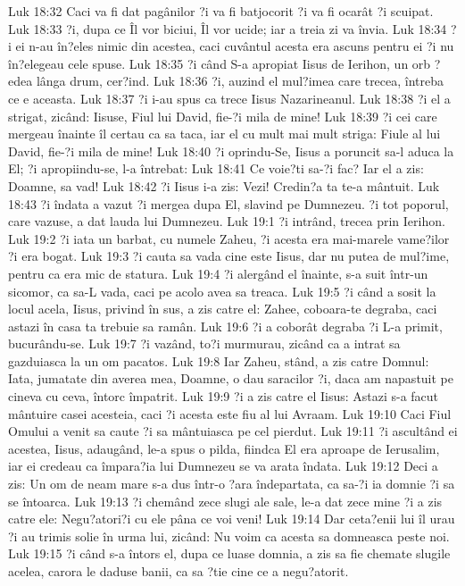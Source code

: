 Luk 18:32  Caci va fi dat pagânilor ?i va fi batjocorit ?i va fi ocarât ?i scuipat.
Luk 18:33  ?i, dupa ce Îl vor biciui, Îl vor ucide; iar a treia zi va învia.
Luk 18:34  ?i ei n-au în?eles nimic din acestea, caci cuvântul acesta era ascuns pentru ei ?i nu în?elegeau cele spuse.
Luk 18:35  ?i când S-a apropiat Iisus de Ierihon, un orb ?edea lânga drum, cer?ind.
Luk 18:36  ?i, auzind el mul?imea care trecea, întreba ce e aceasta.
Luk 18:37  ?i i-au spus ca trece Iisus Nazarineanul.
Luk 18:38  ?i el a strigat, zicând: Iisuse, Fiul lui David, fie-?i mila de mine!
Luk 18:39  ?i cei care mergeau înainte îl certau ca sa taca, iar el cu mult mai mult striga: Fiule al lui David, fie-?i mila de mine!
Luk 18:40  ?i oprindu-Se, Iisus a poruncit sa-l aduca la El; ?i apropiindu-se, l-a întrebat:
Luk 18:41  Ce voie?ti sa-?i fac? Iar el a zis: Doamne, sa vad!
Luk 18:42  ?i Iisus i-a zis: Vezi! Credin?a ta te-a mântuit.
Luk 18:43  ?i îndata a vazut ?i mergea dupa El, slavind pe Dumnezeu. ?i tot poporul, care vazuse, a dat lauda lui Dumnezeu.
Luk 19:1  ?i intrând, trecea prin Ierihon.
Luk 19:2  ?i iata un barbat, cu numele Zaheu, ?i acesta era mai-marele vame?ilor ?i era bogat.
Luk 19:3  ?i cauta sa vada cine este Iisus, dar nu putea de mul?ime, pentru ca era mic de statura.
Luk 19:4  ?i alergând el înainte, s-a suit într-un sicomor, ca sa-L vada, caci pe acolo avea sa treaca.
Luk 19:5  ?i când a sosit la locul acela, Iisus, privind în sus, a zis catre el: Zahee, coboara-te degraba, caci astazi în casa ta trebuie sa ramân.
Luk 19:6  ?i a coborât degraba ?i L-a primit, bucurându-se.
Luk 19:7  ?i vazând, to?i murmurau, zicând ca a intrat sa gazduiasca la un om pacatos.
Luk 19:8  Iar Zaheu, stând, a zis catre Domnul: Iata, jumatate din averea mea, Doamne, o dau saracilor ?i, daca am napastuit pe cineva cu ceva, întorc împatrit.
Luk 19:9  ?i a zis catre el Iisus: Astazi s-a facut mântuire casei acesteia, caci ?i acesta este fiu al lui Avraam.
Luk 19:10  Caci Fiul Omului a venit sa caute ?i sa mântuiasca pe cel pierdut.
Luk 19:11  ?i ascultând ei acestea, Iisus, adaugând, le-a spus o pilda, fiindca El era aproape de Ierusalim, iar ei credeau ca împara?ia lui Dumnezeu se va arata îndata.
Luk 19:12  Deci a zis: Un om de neam mare s-a dus într-o ?ara îndepartata, ca sa-?i ia domnie ?i sa se întoarca.
Luk 19:13  ?i chemând zece slugi ale sale, le-a dat zece mine ?i a zis catre ele: Negu?atori?i cu ele pâna ce voi veni!
Luk 19:14  Dar ceta?enii lui îl urau ?i au trimis solie în urma lui, zicând: Nu voim ca acesta sa domneasca peste noi.
Luk 19:15  ?i când s-a întors el, dupa ce luase domnia, a zis sa fie chemate slugile acelea, carora le daduse banii, ca sa ?tie cine ce a negu?atorit.
